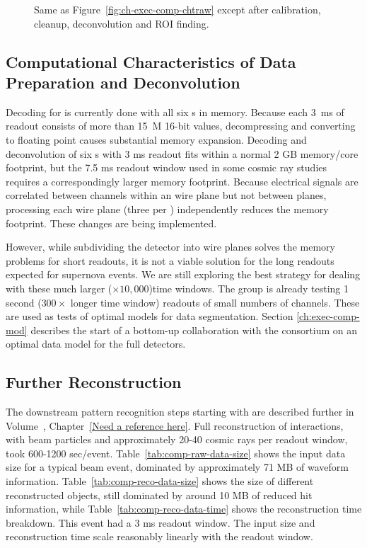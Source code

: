 \begin{figure}[t]
\caption{
Same as Figure~\ref{fig:ch-exec-comp-chtraw} except after calibration, cleanup, deconvolution and ROI finding. 
}
\label{fig:ch-exec-comp-chtroi}
\end{figure}

\subsection{Computational Characteristics of Data Preparation and Deconvolution }
Decoding for  is currently done with all six s in memory. Because each \SI{3}{ms} of  readout consists of more than \SI{15}{M} 16-bit values, decompressing and converting to floating point causes substantial memory expansion.  Decoding and deconvolution of six s with 3 ms readout fits within a normal 2 GB memory/core footprint, but the 7.5 ms readout window used in some cosmic ray studies requires a correspondingly larger memory footprint. Because electrical signals are correlated between channels within an  wire plane but not between planes, processing each wire plane (three per ) independently reduces the memory footprint.  These changes are being implemented.


However,  while subdividing the detector into wire planes solves the memory problems for short readouts, it is  not a viable solution for the long readouts expected for supernova events. We are still exploring the best strategy for dealing with these much larger ($\times 10,000$)time windows. The  group is already testing 1 second ($300 \times$ longer time window) readouts of small numbers of channels.  These are used as tests of optimal models for data segmentation.  Section \ref{ch:exec-comp-mod} describes the start of a bottom-up collaboration with the  consortium on an optimal data model for the full  detectors. 

\subsection{Further Reconstruction}
The downstream pattern recognition steps starting with  are described further in %
Volume~\volnumberphysics, Chapter~\ref{Need a reference here}.  
Full reconstruction of  interactions, with beam particles and approximately 20-40 cosmic rays per readout window, took 600-1200 sec/event.
Table~\ref{tab:comp-raw-data-size} shows the input data size for a typical beam event, dominated by approximately 71 MB of  waveform information.  Table~\ref{tab:comp-reco-data-size} shows the size of different reconstructed objects, still dominated by around 10 MB of reduced  hit information,  while Table~\ref{tab:comp-reco-data-time} shows the reconstruction time breakdown.  This event had a 3 ms readout window.  The input size and reconstruction time scale reasonably linearly with the readout window.  

